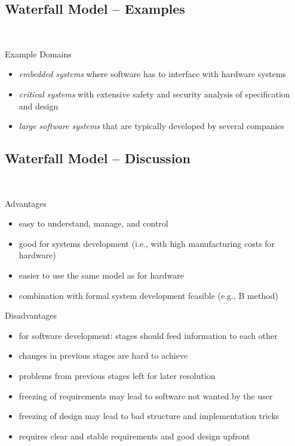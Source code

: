 \subsection{Waterfall Model -- Examples}
\begin{frame}{\insertsubsection\ \mytitlesource{\sommerville}}
	\begin{fancycolumns}[animation=none]
		\begin{example}{Example Domains}
			\begin{itemize}
				\item \emph{embedded systems} where software has to interface with hardware systems
				\item \emph{critical systems} with extensive safety and security analysis of specification and design
				\item \emph{large software systems} that are typically developed by several companies
			\end{itemize}
		\end{example}
	\nextcolumn
	\end{fancycolumns}
\end{frame}

\subsection{Waterfall Model -- Discussion}
\begin{frame}{\insertsubsection\ \mytitlesource{\sommerville}}
	\begin{fancycolumns}
		\begin{note}{Advantages}
			\begin{itemize}
				\item easy to understand, manage, and control
				\item good for systems development (i.e., with high manufacturing costs for hardware)
				\item easier to use the same model as for hardware
				\item combination with formal system development feasible (e.g., B method)
			\end{itemize}
		\end{note}
		\nextcolumn
		\begin{note}{Disadvantages}
				\begin{itemize}
					\item for software development: stages should feed information to each other
					\item changes in previous stages are hard to achieve
					\item problems from previous stages left for later resolution
					\item freezing of requirements may lead to software not wanted by the user
					\item freezing of design may lead to bad structure and implementation tricks
					\item requires clear and stable requirements and good design upfront
				\end{itemize}
		\end{note}
	\end{fancycolumns}
\end{frame}

